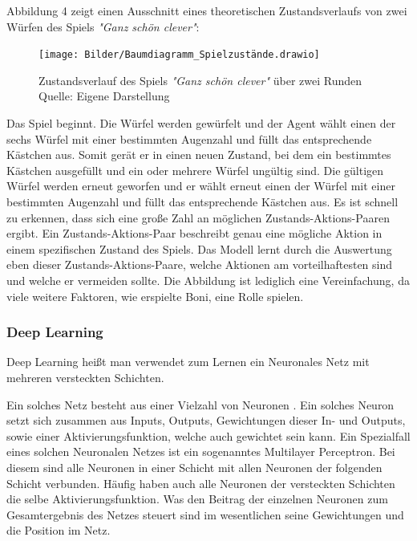 Abbildung 4 zeigt einen Ausschnitt eines theoretischen Zustandsverlaufs von zwei Würfen des Spiels \textit{"Ganz schön clever"}:
\nopagebreak
\begin{figure}[H]
	\texttt{[image: Bilder/Baumdiagramm\_Spielzustände.drawio]} 
	\caption[Zustandsverlauf des Spiels \textit{"Ganz schön clever"} über zwei Runden]{Zustandsverlauf des Spiels \textit{"Ganz schön clever"} über zwei Runden\\ Quelle: Eigene Darstellung}
\end{figure}	

Das Spiel beginnt. Die Würfel werden gewürfelt und der Agent wählt einen der sechs Würfel mit einer bestimmten Augenzahl und füllt das entsprechende Kästchen aus. Somit gerät er in einen neuen Zustand, bei dem ein bestimmtes Kästchen ausgefüllt und ein oder mehrere Würfel ungültig sind. Die gültigen Würfel werden erneut geworfen und er wählt erneut einen der Würfel mit einer bestimmten Augenzahl und füllt das entsprechende Kästchen aus. Es ist schnell zu erkennen, dass sich eine große Zahl an möglichen Zustands-Aktions-Paaren ergibt. Ein Zustands-Aktions-Paar beschreibt genau eine mögliche Aktion in einem spezifischen Zustand des Spiels. Das Modell lernt durch die Auswertung eben dieser Zustands-Aktions-Paare, welche Aktionen am vorteilhaftesten sind und welche er vermeiden sollte. Die Abbildung ist lediglich eine Vereinfachung, da viele weitere Faktoren, wie erspielte Boni, eine Rolle spielen.
\subsubsection{Deep Learning}
Deep Learning heißt man verwendet zum Lernen ein Neuronales Netz mit mehreren versteckten Schichten. 

Ein solches Netz besteht aus einer Vielzahl von Neuronen \cite[Seite 75]{sewak_deep_2019}. Ein solches Neuron setzt sich zusammen aus Inputs, Outputs, Gewichtungen dieser In- und Outputs, sowie einer Aktivierungsfunktion, welche auch gewichtet sein kann. Ein Spezialfall eines solchen Neuronalen Netzes ist ein sogenanntes Multilayer Perceptron. Bei diesem sind alle Neuronen in einer Schicht mit allen Neuronen der folgenden Schicht verbunden. Häufig haben auch alle Neuronen der versteckten Schichten die selbe Aktivierungsfunktion. Was den Beitrag der einzelnen Neuronen zum Gesamtergebnis des Netzes steuert sind im wesentlichen seine Gewichtungen und die Position im Netz.\\

